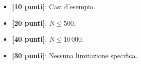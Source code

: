 \begin{itemize}[nolistsep,itemsep=2mm]
  \item \textbf{ [10 punti]}: Casi d'esempio.
  \item \textbf{ [20 punti]}: $N \leq 500$.
  \item \textbf{ [40 punti]}: $N \leq 10\,000$.
  \item \textbf{ [30 punti]}: Nessuna limitazione specifica.
\end{itemize}



\Examples
\begin{example}
%
%
%
\end{example}
